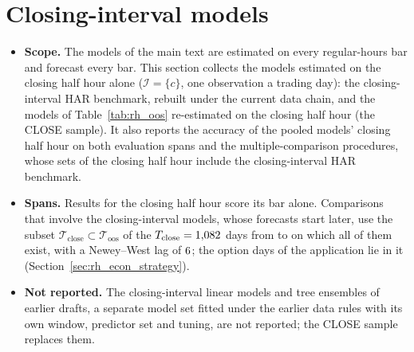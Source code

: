 \section{Closing-interval models}
\label{app:rh_closing}
\begin{itemize}
\item \textbf{Scope.} The models of the main text are estimated on every regular-hours bar and forecast every bar.
  This section collects the models estimated on the closing half hour alone ($\mathcal I = \{c\}$, one observation
  a trading day): the closing-interval HAR benchmark, rebuilt under the current data chain, and the models of
  Table~\ref{tab:rh_oos} re-estimated on the closing half hour (the CLOSE sample). It also reports the accuracy of
  the pooled models' closing half hour on both evaluation spans and the multiple-comparison procedures, whose sets
  of the closing half hour include the closing-interval HAR benchmark.
\item \textbf{Spans.} Results for the closing half hour score its bar alone. Comparisons that involve the
  closing-interval models, whose forecasts start later, use the subset
  $\mathcal T_{\mathrm{close}} \subset \mathcal T_{\mathrm{oos}}$ of the $T_{\mathrm{close}} = 1{,}082$ days from
  \rhoosSpanStart{} to \rhoosSpanEnd{} on which all of them exist, with a Newey--West lag of $6$; the
  option days of the application lie in it (Section~\ref{sec:rh_econ_strategy}).
\item \textbf{Not reported.} The closing-interval linear models and tree ensembles of earlier drafts, a separate
  model set fitted under the earlier data rules with its own window, predictor set and tuning, are not reported;
  the CLOSE sample replaces them.
\end{itemize}

